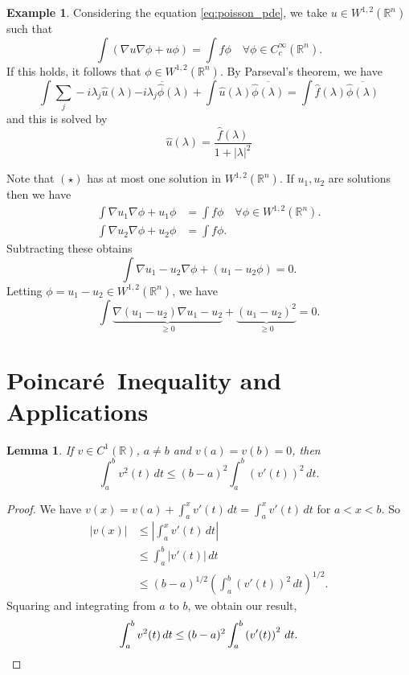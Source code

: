 \documentclass[10pt, oneside, reqno]{amsart}
\theoremstyle{plain}%
\newtheorem{lem}[thm]{Lemma}
\numberwithin{equation}{section}
\theoremstyle{definition}
\newtheorem{exmp}[thm]{Example}
\theoremstyle{remark}
\newcommand{\R}{\mathbb{R}}
\begin{document}
\newcommand{\grad}{\nabla}
\begin{exmp}
	Considering the equation \eqref{eq:poisson_pde}, we take $u \in W^{1, 2}(\R^n)$ such that \[
		\int \left( \grad u \grad \phi + u \phi \right) = \int f \phi \quad \forall \phi \in C_c^\infty(\R^n).
		\tag{$\star$}
	\] If this holds, it follows that $\phi \in W^{1, 2}(\R^n)$.  By Parseval's theorem, we have \[
		\int \sum_{j} -i \lambda_j \hat u(\lambda) \overline{-i \lambda_j \hat \phi(\lambda)} + \int \hat u(\lambda) \overline{\hat \phi(\lambda)} = \int \hat f(\lambda) \overline{ \hat\phi(\lambda)}
	\] and this is solved by \[
		\hat u(\lambda) = \frac{\hat f(\lambda)}{1 + |\lambda|^2}
	\]
	
	Note that $(\star)$ has at most one solution in $W^{1, 2}(\R^n)$.  If $u_1, u_2$ are solutions then we have \begin{align*}
		\int \grad u_1 \grad \phi  + u_1 \phi &= \int f \phi \quad \forall \phi \in W^{1, 2}(\R^n). \\
		\int \grad u_2 \grad \phi + u_2 \phi &= \int f \phi.
	\end{align*}  Subtracting these obtains \[
		\int \grad{u_1 - u_2} \grad \phi + (u_1 - u_2 \phi) = 0.
	\]  Letting $\phi = u_1 - u_2 \in W^{1, 2}(\R^n)$, we have \[
		\int \underbrace{\grad(u_1 - u_2) \grad{u_1 - u_2}}_{\geq 0} + \underbrace{(u_1 - u_2)^2}_{\geq 0} = 0.
	\]
\end{exmp}

\newcommand{\poincare}{Poincar\'e\ }
\section{\poincare Inequality and Applications} %
\label{sec:poincar'e_inequality_and_applications}

\begin{lem}
	\label{lem:poincare_lemma}
	If $v \in C^1(\R)$, $a \neq b$ and $v(a) = v(b) = 0$, then \begin{equation}
		\int_a^b v^2(t) \, dt \leq (b-a)^2 \int_a^b \left(v'(t) \right)^2 \, dt.
	\end{equation}	
\end{lem}

\begin{proof}
	We have $v(x) = v(a) + \int_a^x v'(t) \, dt = \int_a^x v'(t) \, dt$ for $a < x < b$.  So \begin{align*}
		|v(x)| 	&\leq \left| \int_a^x v'(t) \, dt \right| \\
				&\leq \int_a^b |v'(t)| \, dt \\
				&\leq (b-a)^{1/2} \left( \int_a^b \left(v'(t) \right)^2 \, dt \right)^{1/2}.  
	\end{align*}  Squaring and integrating from $a$ to $b$, we obtain our result, \[
		\int_a^b v^2(t) \, dt \leq (b-a)^2 \int_a^b \left(v'(t) \right)^2 \, dt. \qedhere
	\]
\end{proof}
\end{document}
